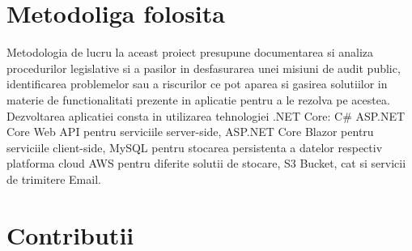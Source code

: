 \section*{Metodoliga folosita}
Metodologia de lucru la aceast proiect presupune documentarea si analiza procedurilor legislative si a pasilor in desfasurarea unei misiuni de audit public, identificarea problemelor sau a riscurilor ce pot aparea si gasirea solutiilor in materie de functionalitati prezente in aplicatie pentru a le rezolva pe acestea. Dezvoltarea aplicatiei consta in utilizarea tehnologiei .NET Core:
C\# ASP.NET Core Web API pentru serviciile server-side, ASP.NET Core Blazor pentru serviciile client-side, MySQL pentru stocarea persistenta a datelor respectiv platforma cloud AWS pentru diferite solutii de stocare, S3 Bucket, cat si  servicii de trimitere Email.

\section*{Contributii}

